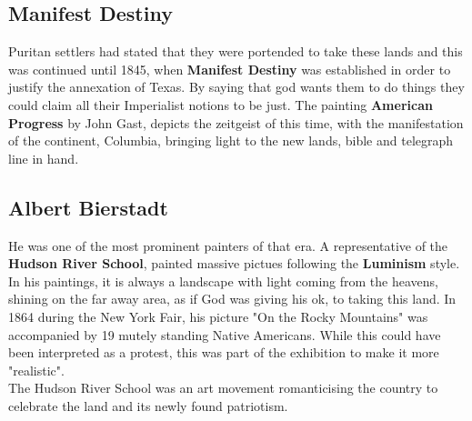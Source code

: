 \documentclass{article}
\begin{document}
	\subsection{Manifest Destiny}
	Puritan settlers had stated that they were portended to take these lands and this was continued until 1845, when \textbf{Manifest Destiny} was established in order to justify the annexation of Texas. By saying that god wants them to do things they could claim all their Imperialist notions to be just. The painting \textbf{American Progress} by John Gast, depicts the zeitgeist of this time, with the manifestation of the continent, Columbia, bringing light to the new lands, bible and telegraph line in hand. \\
	\subsection{Albert Bierstadt}
	He was one of the most prominent painters of that era. A representative of the \textbf{Hudson River School}, painted massive pictues following the \textbf{Luminism} style. In his paintings, it is always a landscape with light coming from the heavens, shining on the far away area, as if God was giving his ok, to taking this land. In 1864 during the New York Fair, his picture "On the Rocky Mountains" was accompanied by 19 mutely standing Native Americans. While this could have been interpreted as a protest, this was part of the exhibition to make it more "realistic". \\
	The Hudson River School was an art movement romanticising the country to celebrate the land and its newly found patriotism. \\
\end{document}
